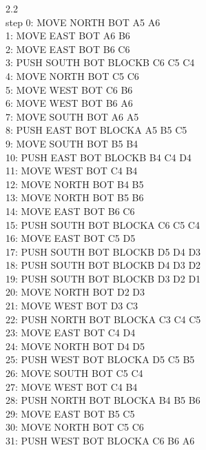 \documentclass[]{article}
\begin{document}
\begin{enumerate}[(a)]
		2.2\\
		step    0: MOVE NORTH BOT A5 A6\\
		        1: MOVE EAST BOT A6 B6\\
		        2: MOVE EAST BOT B6 C6\\
		        3: PUSH SOUTH BOT BLOCKB C6 C5 C4\\
		        4: MOVE NORTH BOT C5 C6\\
		        5: MOVE WEST BOT C6 B6\\
		        6: MOVE WEST BOT B6 A6\\
		        7: MOVE SOUTH BOT A6 A5\\
		        8: PUSH EAST BOT BLOCKA A5 B5 C5\\
		        9: MOVE SOUTH BOT B5 B4\\
		       10: PUSH EAST BOT BLOCKB B4 C4 D4\\
		       11: MOVE WEST BOT C4 B4\\
		       12: MOVE NORTH BOT B4 B5\\
		       13: MOVE NORTH BOT B5 B6\\
		       14: MOVE EAST BOT B6 C6\\
		       15: PUSH SOUTH BOT BLOCKA C6 C5 C4\\
		       16: MOVE EAST BOT C5 D5\\
		       17: PUSH SOUTH BOT BLOCKB D5 D4 D3\\
		       18: PUSH SOUTH BOT BLOCKB D4 D3 D2\\
		       19: PUSH SOUTH BOT BLOCKB D3 D2 D1\\
		       20: MOVE NORTH BOT D2 D3\\
		       21: MOVE WEST BOT D3 C3\\
		       22: PUSH NORTH BOT BLOCKA C3 C4 C5\\
		       23: MOVE EAST BOT C4 D4\\
		       24: MOVE NORTH BOT D4 D5\\
		       25: PUSH WEST BOT BLOCKA D5 C5 B5\\
		       26: MOVE SOUTH BOT C5 C4\\
		       27: MOVE WEST BOT C4 B4\\
		       28: PUSH NORTH BOT BLOCKA B4 B5 B6\\
		       29: MOVE EAST BOT B5 C5\\
		       30: MOVE NORTH BOT C5 C6\\
		       31: PUSH WEST BOT BLOCKA C6 B6 A6\\
		       

\end{enumerate}
\end{document}
